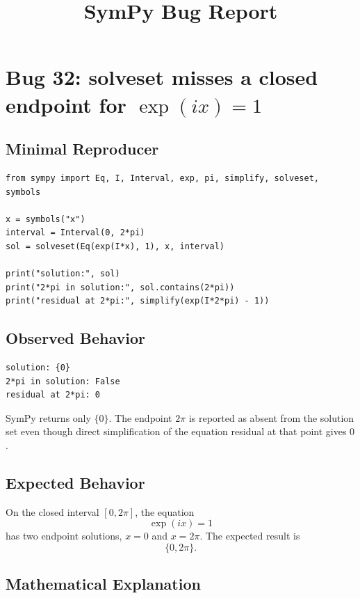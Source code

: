 \documentclass[11pt]{article}
\title{SymPy Bug Report}
\author{}
\date{}
\begin{document}
\maketitle

\section{Bug 32: solveset misses a closed endpoint for \texorpdfstring{\(\exp(i x)=1\)}{exp(i*x)=1}}

\subsection{Minimal Reproducer}

\medskip

\begin{lstlisting}[style=bugpython]
from sympy import Eq, I, Interval, exp, pi, simplify, solveset, symbols

x = symbols("x")
interval = Interval(0, 2*pi)
sol = solveset(Eq(exp(I*x), 1), x, interval)

print("solution:", sol)
print("2*pi in solution:", sol.contains(2*pi))
print("residual at 2*pi:", simplify(exp(I*2*pi) - 1))
\end{lstlisting}

\subsection{Observed Behavior}

\medskip

\begin{lstlisting}[style=bugpython]
solution: {0}
2*pi in solution: False
residual at 2*pi: 0
\end{lstlisting}

SymPy returns only \(\{0\}\).  The endpoint \(2\pi\) is reported as absent from
the solution set even though direct simplification of the equation residual at
that point gives \(0\).

\subsection{Expected Behavior}

On the closed interval \([0,2\pi]\), the equation
\[
    \exp(i x)=1
\]
has two endpoint solutions, \(x=0\) and \(x=2\pi\).  The expected result is
\[
    \{0,2\pi\}.
\]

\subsection{Mathematical Explanation}
\end{document}
